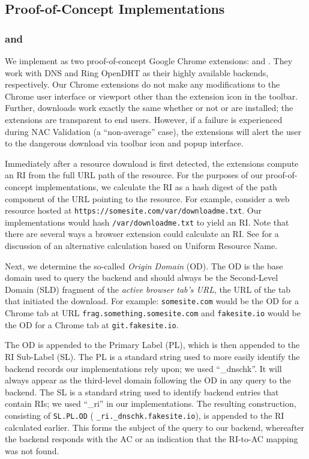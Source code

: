 \subsection{Proof-of-Concept Implementations}

\subsubsection{\DNSSYS{} and \DHTSYS{}}

We implement \SYSTEM{} as two proof-of-concept Google Chrome extensions:
\DNSSYS{} and \DHTSYS{}. They work with DNS and Ring OpenDHT as their highly
available backends, respectively. Our Chrome extensions do not make any
modifications to the Chrome user interface or viewport other than the extension
icon in the toolbar. Further, downloads work exactly the same whether or not
\DNSSYS{} or \DHTSYS{} are installed; the extensions are transparent to end
users. However, if a failure is experienced during NAC Validation (\ie a
``non-average'' case), the extensions will alert the user to the dangerous
download via toolbar icon and popup interface.

Immediately after a resource download is first detected, the extensions compute
an RI from the full URL path of the resource. For the purposes of our
proof-of-concept implementations, we calculate the RI as a hash digest of the
path component of the URL pointing to the resource. For example, consider a web
resource hosted at \texttt{https://somesite.com/var/downloadme.txt}. Our
implementations would hash \texttt{/var/downloadme.txt} to yield an RI. Note
that there are several ways a browser extension could calculate an RI. See
 for a discussion of an alternative calculation based on
Uniform Resource Name.

Next, we determine the so-called \emph{Origin Domain} (OD). The OD is the base
domain used to query the backend and should always be the Second-Level Domain
(SLD) fragment of the \emph{active browser tab's URL}, \ie the URL of the tab
that initiated the download. For example: \texttt{somesite.com} would be the OD
for a Chrome tab at URL \texttt{frag.something.somesite.com} and
\texttt{fakesite.io} would be the OD for a Chrome tab at
\texttt{git.fakesite.io}.

The OD is appended to the Primary Label (PL), which is then appended to the
RI Sub-Label (SL). The PL is a standard string used to more easily identify the
backend records our implementations rely upon; we used ``\_dnschk''. It will
always appear as the third-level domain following the OD in any query to the
backend. The SL is a standard string used to identify backend entries that
contain RIs; we used ``\_ri'' in our implementations. The resulting
construction, consisting of \texttt{SL.PL.OD} (\eg
\texttt{\_ri.\_dnschk.fakesite.io}), is appended to the RI calculated earlier.
This forms the subject of the query to our backend, whereafter the backend
responds with the AC or an indication that the RI-to-AC mapping was not found.


